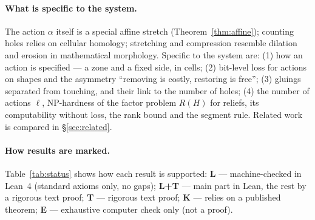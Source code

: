 \documentclass[11pt,a4paper]{article}
\theoremstyle{plain}
\theoremstyle{definition}
\theoremstyle{remark}
\begin{document}
\paragraph{What is specific to the system.} The action $\alpha$ itself is a special affine stretch (Theorem~\ref{thm:affine}); counting holes relies on cellular homology; stretching and compression resemble dilation and erosion in mathematical morphology. Specific to the system are: (1) how an action is specified — a zone and a fixed side, in cells; (2) bit-level loss for actions on shapes and the asymmetry ``removing is costly, restoring is free''; (3) gluings separated from touching, and their link to the number of holes; (4) the number of actions $\ell$, NP-hardness of the factor problem $R(H)$ for reliefs, its computability without loss, the rank bound and the segment rule. Related work is compared in §\ref{sec:related}.

\paragraph{How results are marked.} Table~\ref{tab:status} shows how each result is supported: \textbf{L} — machine-checked in Lean~4 (standard axioms only, no gaps); \textbf{L+T} — main part in Lean, the rest by a rigorous text proof; \textbf{T} — rigorous text proof; \textbf{K} — relies on a published theorem; \textbf{E} — exhaustive computer check only (not a proof).
\end{document}
